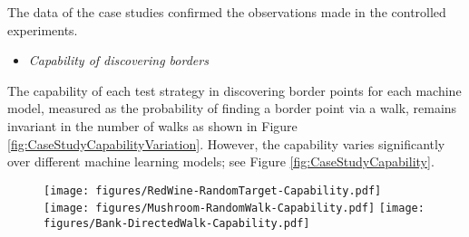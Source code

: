 \documentclass[preprint,1p,authoryear,times]{elsarticle}
\begin{document}
The data of the case studies confirmed the observations made in the controlled experiments. 

\begin{itemize}
\item \emph{Capability of discovering borders} 
\end{itemize}

The capability of each test strategy in discovering border points for each machine model, measured as the probability of finding a border point via a walk, remains invariant in the number of walks as shown in Figure \ref{fig:CaseStudyCapabilityVariation}. However, the capability varies significantly over different machine learning models; see Figure \ref{fig:CaseStudyCapability}. 

\begin{figure}[h]
	\centering
	\texttt{[image: figures/RedWine-RandomTarget-Capability.pdf]}
	\texttt{[image: figures/Mushroom-RandomWalk-Capability.pdf]}
	\texttt{[image: figures/Bank-DirectedWalk-Capability.pdf]}\\

\end{figure}
\end{document}
